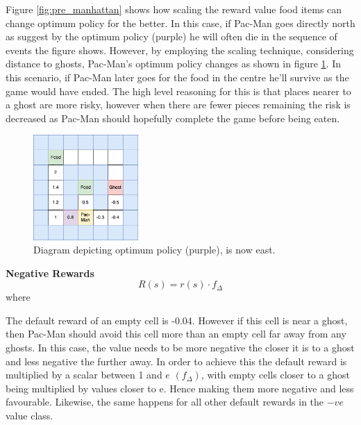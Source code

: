 \documentclass[letterpaper, 11pt, journal, final]{IEEEtran}
\begin{document}
Figure \ref{fig:pre_manhattan} shows how scaling the reward value food items can change optimum policy for the better. In this case, if Pac-Man goes directly north as suggest by the optimum policy (purple) he will often die in the sequence of events the figure shows. However, by employing the scaling technique, considering distance to ghosts, Pac-Man's optimum policy changes as shown in figure \ref{fig:post_manhattan}. In this scenario, if Pac-Man later goes for the food in the centre he'll survive as the game would have ended. The high level reasoning for this is that places nearer to a ghost are more risky, however when there are fewer pieces remaining the risk is decreased as Pac-Man should hopefully complete the game before being eaten.\\

\begin{figure}[ht]
    \centering
    \includegraphics[width=4cm]{post_manhattan.png}
    \caption{Diagram depicting optimum policy (purple), is now east.}
    \label{fig:post_manhattan}
\end{figure}

\textbf{Negative Rewards}
\[R(s) = r(s) \cdot f_\Delta \]
where
\begin{description}
\item[s \(\in\) \{empty, ghost, pacman\}]
\item
\end{description}

The default reward of an empty cell is -0.04. However if this cell is near a ghost, then Pac-Man should avoid this cell more than an empty cell far away from any ghosts. In this case, the value needs to be more negative the closer it is to a ghost and less negative the further away. In order to achieve this the default reward is multiplied by a scalar between 1 and \(e\) \((f_\Delta)\), with empty cells closer to a ghost being multiplied by values closer to e. Hence making them more negative and less favourable. Likewise, the same happens for all other default rewards in the \(-ve\) value class.\\
\end{document}
